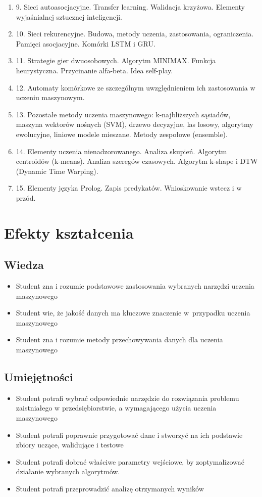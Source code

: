 \documentclass[12pt, a4paper]{article}
\begin{document}
\begin{enumerate}
  \item 9. Sieci autoasocjacyjne. Transfer learning. Walidacja krzyżowa. Elementy wyjaśnialnej sztucznej inteligencji.
  \item 10. Sieci rekurencyjne. Budowa, metody uczenia, zastosowania, ograniczenia. Pamięci asocjacyjne. Komórki LSTM i GRU.
  \item 11. Strategie gier dwuosobowych. Algorytm MINIMAX.  Funkcja heurystyczna. Przycinanie alfa-beta. Idea self-play.
  \item 12. Automaty komórkowe ze szczególnym uwzględnieniem ich zastosowania w uczeniu maszynowym.
  \item 13. Pozostałe metody uczenia maszynowego: k-najbliższych sąsiadów, maszyna wektorów nośnych (SVM), drzewo decyzyjne, las losowy, algorytmy ewolucyjne, liniowe modele mieszane. Metody zespołowe (ensemble).
  \item 14. Elementy uczenia nienadzorowanego. Analiza skupień. Algorytm centroidów (k-means). Analiza szeregów czasowych. Algorytm k-shape i DTW (Dynamic Time Warping).
  \item 15. Elementy języka Prolog. Zapis predykatów. Wnioskowanie wstecz i w przód.
\end{enumerate}

\section{Efekty kształcenia}

\subsection*{Wiedza}
\begin{itemize}
  \item Student zna i rozumie podstawowe zastosowania wybranych narzędzi uczenia maszynowego
  \item Student wie, że jakość danych ma kluczowe znaczenie w przypadku uczenia maszynowego
  \item Student zna i rozumie metody przechowywania danych dla uczenia maszynowego
\end{itemize}

\subsection*{Umiejętności}
\begin{itemize}
  \item Student potrafi  wybrać odpowiednie narzędzie do rozwiązania problemu zaistniałego w przedsiębiorstwie, a wymagającego użycia uczenia maszynowego
  \item Student potrafi  poprawnie przygotować dane i stworzyć na ich podstawie zbiory uczące, walidujące i testowe
  \item Student potrafi dobrać właściwe parametry wejściowe, by zoptymalizować działanie wybranych algorytmów.
  \item Student potrafi przeprowadzić analizę otrzymanych wyników
\end{itemize}
\end{document}
